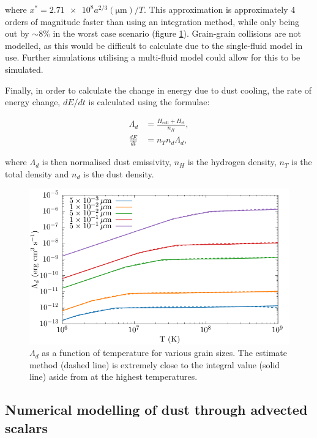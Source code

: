 \noindent
where $x^* = \num{2.71e8} a^{2/3} (\si{\micro\metre})/T$.
This approximation is approximately 4 orders of magnitude faster than using an integration method, while only being out by $\sim 8\%$ in the worst case scenario (figure \ref{fig:lambdacomparison}).
Grain-grain collisions are not modelled, as this would be difficult to calculate due to the single-fluid model in use.
Further simulations utilising a multi-fluid model could allow for this to be simulated.

Finally, in order to calculate the change in energy due to dust cooling, the rate of energy change, $dE/dt$ is calculated using the formulae:

\begin{subequations}
  \begin{align}
    \Lambda_d     & = \frac{H_\text{coll} + H_\text{el}}{n_H} , \\
    \frac{dE}{dt} & = n_T n_d \Lambda_d ,
  \end{align}
\end{subequations}

\noindent
where $\Lambda_d$ is then normalised dust emissivity,
$n_H$ is the hydrogen density,
$n_T$ is the total density
and $n_d$ is the dust density.

\begin{figure}
  \centering
  \includegraphics{assets/grain-transparency/lambda-comp.pdf}
  \caption[Comparison of electron transparency methods.]{$\Lambda_d$ as a function of temperature for various grain sizes. The estimate method (dashed line) is extremely close to the integral value (solid line) aside from at the highest temperatures.}
  \label{fig:lambdacomparison}
\end{figure}

\subsection{Numerical modelling of dust through advected scalars}

